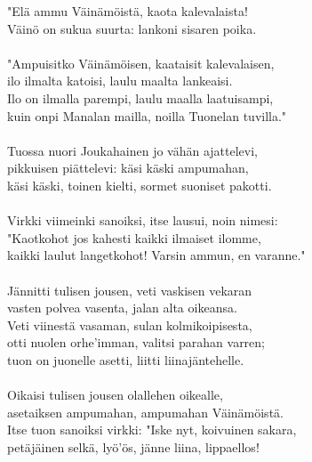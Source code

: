 "Elä ammu Väinämöistä, kaota kalevalaista!                  \\
Väinö on sukua suurta: lankoni sisaren poika.               \\
                                                            \\
"Ampuisitko Väinämöisen, kaataisit kalevalaisen,            \\
ilo ilmalta katoisi, laulu maalta lankeaisi.                \\
Ilo on ilmalla parempi, laulu maalla laatuisampi,           \\
kuin onpi Manalan mailla, noilla Tuonelan tuvilla."         \\
                                                            \\
Tuossa nuori Joukahainen jo vähän ajattelevi,               \\
pikkuisen piättelevi: käsi käski ampumahan,                 \\
käsi käski, toinen kielti, sormet suoniset pakotti.         \\
                                                            \\
Virkki viimeinki sanoiksi, itse lausui, noin nimesi:        \\
"Kaotkohot jos kahesti kaikki ilmaiset ilomme,              \\
kaikki laulut langetkohot! Varsin ammun, en varanne."       \\
                                                            \\
Jännitti tulisen jousen, veti vaskisen vekaran              \\
vasten polvea vasenta, jalan alta oikeansa.                 \\
Veti viinestä vasaman, sulan kolmikoipisesta,               \\
otti nuolen orhe'imman, valitsi parahan varren;             \\
tuon on juonelle asetti, liitti liinajäntehelle.            \\
                                                            \\
Oikaisi tulisen jousen olallehen oikealle,                  \\
asetaiksen ampumahan, ampumahan Väinämöistä.                \\
Itse tuon sanoiksi virkki: "Iske nyt, koivuinen sakara,     \\
petäjäinen selkä, lyö'ös, jänne liina, lippaellos!          \\
